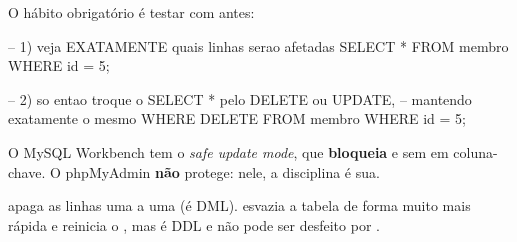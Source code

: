 O hábito obrigatório é testar com  antes:

\begin{sqlcode}
-- 1) veja EXATAMENTE quais linhas serao afetadas
SELECT * FROM membro WHERE id = 5;

-- 2) so entao troque o SELECT * pelo DELETE ou UPDATE,
--    mantendo exatamente o mesmo WHERE
DELETE FROM membro WHERE id = 5;
\end{sqlcode}

\newpage

\begin{dica}
O MySQL Workbench tem o \emph{safe update mode}, que \textbf{bloqueia}
 e  sem  em coluna-chave. O
phpMyAdmin \textbf{não} protege: nele, a disciplina é sua.

 apaga as linhas uma a uma (é DML).
 esvazia a tabela de forma muito mais rápida e
reinicia o , mas é DDL e não pode ser desfeito por
.
\end{dica}

